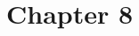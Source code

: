 \documentclass[../../main.tex]{subfiles}
\begin{document}
\section{Chapter 8}
\newpage
\newpage
\end{document}

